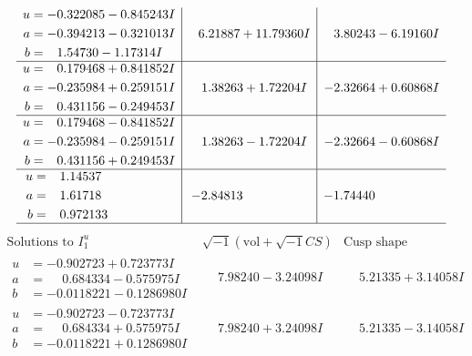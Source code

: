 \documentclass[1p]{elsarticle_modified}
\theoremstyle{definition}
\newcommand{\I}{\sqrt{-1}}
\begin{document}
$$\begin{array}{c|c|c}
\begin{aligned}
u &= -0.322085 - 0.845243 I \\
a &= -0.394213 - 0.321013 I \\
b &= \phantom{-}1.54730 - 1.17314 I\end{aligned}
 & \phantom{-}6.21887 + 11.79360 I & \phantom{-}3.80243 - 6.19160 I \\ \hline\begin{aligned}
u &= \phantom{-}0.179468 + 0.841852 I \\
a &= -0.235984 + 0.259151 I \\
b &= \phantom{-}0.431156 - 0.249453 I\end{aligned}
 & \phantom{-}1.38263 + 1.72204 I & -2.32664 + 0.60868 I \\ \hline\begin{aligned}
u &= \phantom{-}0.179468 - 0.841852 I \\
a &= -0.235984 - 0.259151 I \\
b &= \phantom{-}0.431156 + 0.249453 I\end{aligned}
 & \phantom{-}1.38263 - 1.72204 I & -2.32664 - 0.60868 I \\ \hline\begin{aligned}
u &= \phantom{-}1.14537\phantom{ +0.000000I} \\
a &= \phantom{-}1.61718\phantom{ +0.000000I} \\
b &= \phantom{-}0.972133\phantom{ +0.000000I}\end{aligned}
 & -2.84813\phantom{ +0.000000I} & -1.74440\phantom{ +0.000000I}\\
 \hline 
 \end{array}$$\newpage$$\begin{array}{c|c|c}  
\text{Solutions to }I^u_{1}& \I (\text{vol} + \sqrt{-1}CS) & \text{Cusp shape}\\
 \hline 
\begin{aligned}
u &= -0.902723 + 0.723773 I \\
a &= \phantom{-}0.684334 - 0.575975 I \\
b &= -0.0118221 - 0.1286980 I\end{aligned}
 & \phantom{-}7.98240 - 3.24098 I & \phantom{-}5.21335 + 3.14058 I \\ \hline\begin{aligned}
u &= -0.902723 - 0.723773 I \\
a &= \phantom{-}0.684334 + 0.575975 I \\
b &= -0.0118221 + 0.1286980 I\end{aligned}
 & \phantom{-}7.98240 + 3.24098 I & \phantom{-}5.21335 - 3.14058 I \\ \hline\begin{aligned}

\end{aligned}
\end{array}$$
\end{document}
